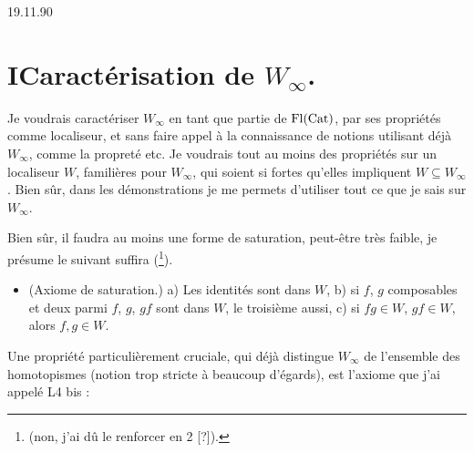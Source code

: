 \clearpage

\printedpage{--}


\clearpage



\hfill 19.11.90

\section*{I\quad Caractérisation de $W_\infty$.}

Je voudrais caractériser $W_\infty$ en tant que partie de $\mathrm{Fl}(\mathrm{Cat})$, par ses propriétés comme localiseur, et sans faire appel à la connaissance de notions utilisant déjà $W_\infty$, comme la propreté etc. Je voudrais tout au moins des propriétés sur un localiseur $W$, familières pour $W_\infty$, qui soient si fortes qu'elles impliquent $W \subseteq W_\infty$. Bien sûr, dans les démonstrations je me permets d'utiliser tout ce que je sais sur $W_\infty$.

Bien sûr, il faudra au moins une forme de saturation, peut-être très faible, je présume le suivant suffira (\footnote{(non, j'ai dû le renforcer en 2 [?]).}).

\begin{itemize}[leftmargin=*]
\item[\textbf{W(1)}] (Axiome de saturation.) a) Les identités sont dans $W$, b) si $f$, $g$ composables et deux parmi $f$, $g$, $gf$ sont dans $W$, le troisième aussi, c) si $fg \in W$, $gf \in W$, alors $f, g \in W$.
\end{itemize}

Une propriété particulièrement cruciale, qui déjà distingue $W_\infty$ de l'ensemble des homotopismes (notion trop stricte à beaucoup d'égards), est l'axiome que j'ai appelé L4 bis :

